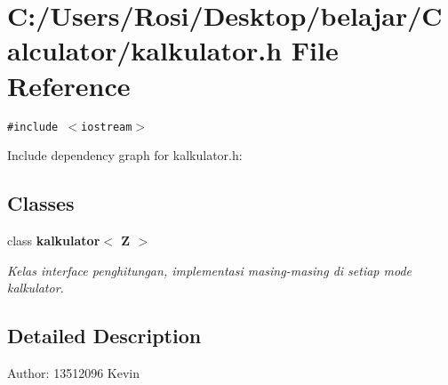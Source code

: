 \section{C:/Users/Rosi/Desktop/belajar/Calculator/kalkulator.h File Reference}
\label{kalkulator_8h}
{\tt \#include $<$iostream$>$}\par


Include dependency graph for kalkulator.h:\subsection*{Classes}
\begin{CompactItemize}
\item 
class {\bf kalkulator$<$ Z $>$}
\begin{CompactList}\small\item\em Kelas interface penghitungan, implementasi masing-masing di setiap mode kalkulator. \item\end{CompactList}\end{CompactItemize}


\subsection{Detailed Description}
\begin{Desc}
\item[Author:]13512096 Kevin \end{Desc}
